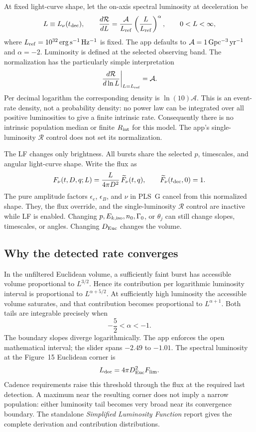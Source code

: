 \documentclass[11pt,a4paper]{article}
\begin{document}
At fixed light-curve shape, let the on-axis spectral luminosity at deceleration be
\begin{equation}
 L\equiv L_\nu(t_{\rm dec}),\qquad
 \frac{d\mathcal R}{dL}=\frac{\mathcal A}{L_{\rm ref}}
       \left(\frac{L}{L_{\rm ref}}\right)^\alpha,
 \qquad 0<L<\infty,
 \label{eq:lf_intensity}
\end{equation}
where $L_{\rm ref}=10^{32}\,{\rm erg\,s^{-1}\,Hz^{-1}}$ is fixed.
The app defaults to $\mathcal A=1\,{\rm Gpc^{-3}\,yr^{-1}}$ and $\alpha=-2$.
Luminosity is defined at the selected observing band. The normalization has the
particularly simple interpretation
\[
 \left.\frac{d\mathcal R}{d\ln L}\right|_{L=L_{\rm ref}}=\mathcal A.
\]
Per decimal logarithm the corresponding density is $\ln(10)\mathcal A$.
This is an event-rate density, not a probability density: no power law can be
integrated over all positive luminosities to give a finite intrinsic rate.
Consequently there is no intrinsic population median or finite $R_{\rm int}$
for this model. The app's single-luminosity $\mathcal R$ control does not set
its normalization.

The LF changes only brightness. All bursts share the selected $p$, timescales,
and angular light-curve shape. Write the flux as
\begin{equation}
 F_\nu(t,D,q;L)=\frac{L}{4\pi D^2}\,
        \widetilde F_\nu(t,q),\qquad
 \widetilde F_\nu(t_{\rm dec},0)=1.
\end{equation}
The pure amplitude factors $\epsilon_e$, $\epsilon_B$, and $\nu$ in PLS~G
cancel from this normalized shape. They, the flux override, and the
single-luminosity $\mathcal R$ control are inactive while LF is enabled.
Changing $p,E_{k,\rm iso},n_0,\Gamma_0$, or $\theta_j$ can still change
slopes, timescales, or angles. Changing $D_{\rm Euc}$ changes the volume.

\subsection{Why the detected rate converges}

In the unfiltered Euclidean volume, a sufficiently faint burst has accessible
volume proportional to
$L^{3/2}$. Hence its contribution per logarithmic luminosity interval is
proportional to $L^{\alpha+5/2}$. At sufficiently high luminosity the
accessible volume saturates, and that contribution becomes proportional to
$L^{\alpha+1}$. Both tails are integrable precisely when
\begin{equation}
 -\frac52<\alpha<-1.
\end{equation}
The boundary slopes diverge logarithmically. The app enforces the open
mathematical interval; the slider spans $-2.49$ to $-1.01$.
The spectral luminosity at the Figure~15 Euclidean corner is
\[
 L_{\rm dec}=4\pi D_{\rm Euc}^2F_{\rm lim}.
\]
Cadence requirements raise this threshold through the flux at the required
last detection. A maximum near the resulting corner does not imply a narrow
population: either luminosity tail becomes very broad near its convergence
boundary. The standalone \emph{Simplified Luminosity Function} report gives
the complete derivation and contribution distributions.
\end{document}
